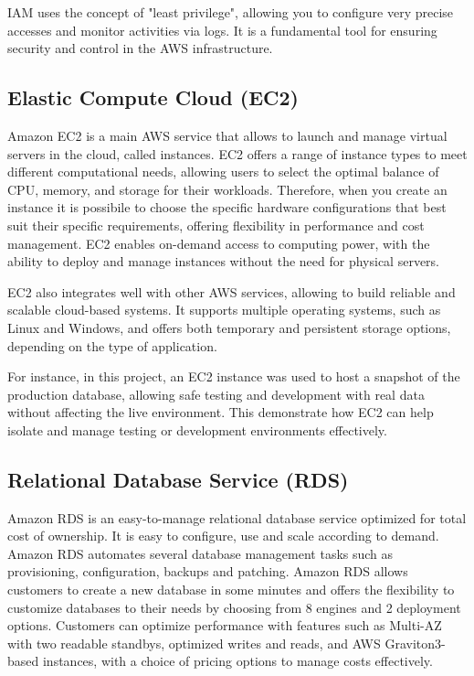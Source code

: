 IAM uses the concept of "least privilege", allowing you to configure very precise accesses and monitor activities via logs. It is a fundamental tool for ensuring security and control in the \ac{AWS} infrastructure.
\subsection{Elastic Compute Cloud (EC2)}
Amazon \acf{EC2} is a main \ac{AWS} service that allows to launch and manage virtual servers in the cloud, called instances. \ac{EC2} offers a range of instance types to meet different computational needs, allowing users to select the optimal balance of CPU, memory, and storage for their workloads. Therefore, when you create an instance it is possibile to choose the specific hardware configurations that best suit their specific requirements, offering flexibility in performance and cost management. \ac{EC2} enables on-demand access to computing power, with the ability to deploy and manage instances without the need for physical servers.

\ac{EC2} also integrates well with other \ac{AWS} services, allowing to build reliable and scalable cloud-based systems. It supports multiple operating systems, such as Linux and Windows, and offers both temporary and persistent storage options, depending on the type of application.

For instance, in this project, an \ac{EC2} instance was used to host a snapshot of the production database, allowing safe testing and development with real data without affecting the live environment. This demonstrate how \ac{EC2} can help isolate and manage testing or development environments effectively.
\subsection{Relational Database Service (RDS)}
\label{sec:rds}
Amazon \ac{RDS} is an easy-to-manage relational database service optimized for total cost of ownership. It is easy to configure, use and scale according to demand. Amazon \ac{RDS} automates several database management tasks such as provisioning, configuration, backups and patching. Amazon \ac{RDS} allows customers to create a new database in some minutes and offers the flexibility to customize databases to their needs by choosing from 8 engines and 2 deployment options. Customers can optimize performance with features such as Multi-AZ with two readable standbys, optimized writes and reads, and \ac{AWS} Graviton3-based instances, with a choice of pricing options to manage costs effectively.

